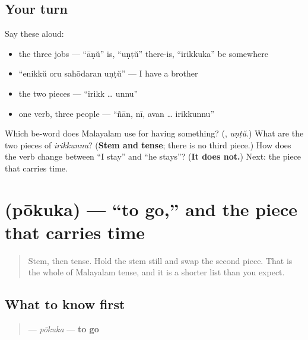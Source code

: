 \subsection*{Your turn}
Say these aloud:

\begin{itemize}
\raggedright
  \item the three jobs — \textquotedblleft{}āṇŭ\textquotedblright{} is, \textquotedblleft{}uṇṭŭ\textquotedblright{} there-is, \textquotedblleft{}irikkuka\textquotedblright{} be somewhere
  \item \textquotedblleft{}enikkŭ oru sahōdaran uṇṭŭ\textquotedblright{} — I have a brother
  \item the two pieces — \textquotedblleft{}irikk … unnu\textquotedblright{}
  \item one verb, three people — \textquotedblleft{}ñān, nī, avan … irikkunnu\textquotedblright{}
\end{itemize}

\begin{tcolorbox}[breakable,colback=teal!4,colframe=teal!35!black,title={Before you move on}]
Which be-word does Malayalam use for having something? (\textbf{}, \emph{uṇṭŭ}.) What are the two pieces of \emph{irikkunnu}? (\textbf{Stem and tense}; there is no third piece.) How does the verb change between \textquotedblleft{}I stay\textquotedblright{} and \textquotedblleft{}he stays\textquotedblright{}? (\textbf{It does not.}) Next: the piece that carries time.
\end{tcolorbox}
\section[\texorpdfstring{\ml{പോകുക} (pōkuka)}{പോകുക (pōkuka)}]{ (pōkuka) — \textquotedblleft{}to go,\textquotedblright{} and the piece that carries time}

\label{lesson:ML-C32-pokuka}



\begin{quote}
Stem, then tense. Hold the stem still and swap the second piece. That is the whole of Malayalam tense, and it is a shorter list than you expect.
\end{quote}

\subsection*{What to know first}
\begin{quote}
\textbf{} — \emph{pōkuka} — \textbf{to go}
\end{quote}

